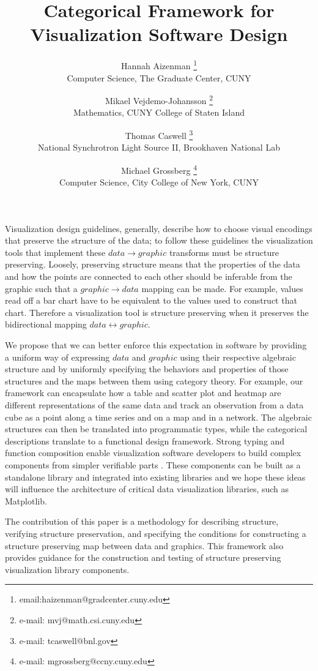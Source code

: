 \documentclass[review]{vgtc}
\title{Categorical Framework for Visualization Software Design}
\author{Hannah Aizenman \thanks{email:haizenman@gradcenter.cuny.edu}\\%
        \scriptsize Computer Science, The Graduate Center, CUNY
\and Mikael Vejdemo-Johansson \thanks{e-mail: mvj@math.csi.cuny.edu}\\%
        \scriptsize  Mathematics, CUNY College of Staten Island %
\and Thomas Caswell \thanks{e-mail: tcaswell@bnl.gov}\\%
  \scriptsize National Synchrotron Light Source II, Brookhaven National Lab%
\and Michael Grossberg \thanks{e-mail: mgrossberg@ccny.cuny.edu}\\%
  \scriptsize Computer Science, City College of New York, CUNY}
\theoremstyle{definition}
\theoremstyle{remark}
\begin{document}

\label{sec:intro}

\maketitle

Visualization design guidelines, generally, describe how to choose visual encodings that preserve the structure of the data; to follow these guidelines the visualization tools that implement these $data \rightarrow graphic$ transforms must be structure preserving. Loosely, preserving structure means that the properties of the data and how the points are connected to each other should be inferable from the graphic such that a $graphic \rightarrow data$ mapping can be made. For example, values read off a bar chart have to be equivalent to the values used to construct that chart. Therefore a visualization tool is structure preserving when it preserves the bidirectional mapping $data\leftrightarrow graphic$.

We propose that we can better enforce this expectation in software by providing a uniform way of expressing $data$ and $graphic$ using their respective algebraic structure and by uniformly specifying the behaviors and properties of those structures and the maps between them using category theory. For example, our framework can encapsulate how a table and scatter plot and heatmap are different representations of the same data and track an observation from a data cube as a point along a time series and on a map and in a network. The algebraic structures can then be translated into programmatic types, while the categorical descriptions translate to a functional design framework. Strong typing and function composition enable visualization software developers to build complex components from simpler verifiable parts \cite{huHowFunctionalProgramming2015, hughesWhyFunctionalProgramming1989}. These components can be built as a standalone library and integrated into existing libraries and we hope these ideas will influence the architecture of critical data visualization libraries, such as Matplotlib.

The contribution of this paper is a methodology for describing structure, verifying structure preservation, and specifying the conditions for constructing a structure preserving map between data and graphics. This framework also provides guidance for the construction and testing of structure preserving visualization library components.
\end{document}
